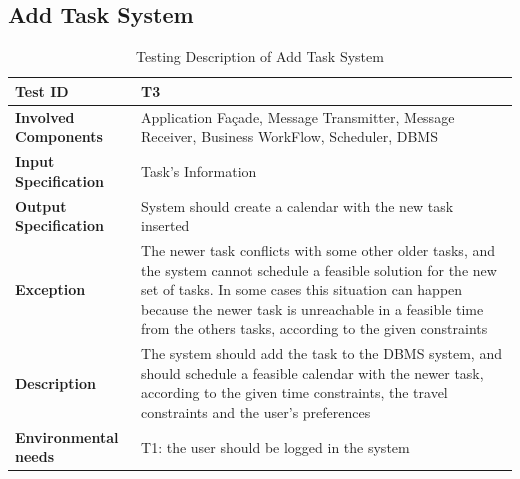 \subsection*{Add Task System}

\begin{table}[H]
    \centering
    \begin{tabular}{p{4.55cm} p{7cm}}
        
        \hline
        
        \textbf{Test ID}                & T3 \\
        
        \hline
        
        \textbf{Involved Components}    & Application Façade, Message Transmitter, Message Receiver, Business                                          WorkFlow, Scheduler, DBMS\\
        
        \hline
        
        \textbf{Input Specification}    & Task's Information\\
        
        \hline
        
        \textbf{Output Specification}   & System should create a calendar with the new task inserted\\
        
        \hline
        
        \textbf{Exception}              & The newer task conflicts with some other older tasks, and the system cannot schedule a feasible solution for the new set of tasks. In some cases this situation can happen because the newer task is unreachable in a feasible time from the others tasks, according to the given constraints\\
        
        \hline
        
        \textbf{Description}            & The system should add the task to the DBMS system, and should schedule a feasible calendar with the newer task, according to the given time constraints, the travel constraints and the user's preferences\\
        \hline
        
        \textbf{Environmental needs}    & T1: the user should be logged in the system\\
        
        \hline
        
    \end{tabular}
    \caption{Testing Description of Add Task System}
\end{table}




